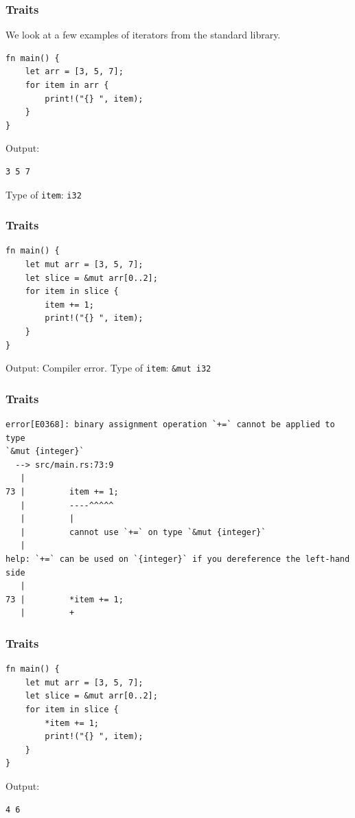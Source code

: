 \begin{frame}[fragile]
    \frametitle{Traits}
    We look at a few examples of iterators from the standard library.
    \vfill
    \begin{verbatim}
fn main() {
    let arr = [3, 5, 7];
    for item in arr {
        print!("{} ", item);
    }
}
    \end{verbatim}
    \vfill
    Output:
    \pause
    \begin{verbatim}
3 5 7 
    \end{verbatim}
    \pause
    \vfill
    Type of \texttt{item}:
    \pause
    \texttt{i32}
\end{frame}

\begin{frame}[fragile]
    \frametitle{Traits}
    \begin{verbatim}
fn main() {
    let mut arr = [3, 5, 7];
    let slice = &mut arr[0..2];
    for item in slice {
        item += 1;
        print!("{} ", item);
    }
}
    \end{verbatim}
    \vfill
    Output:
    \pause
    Compiler error.
    \pause
    \vfill
    Type of \texttt{item}:
    \pause
    \texttt{\&mut i32}
\end{frame}

\begin{frame}[fragile]
    \frametitle{Traits}
    \begin{verbatim}
error[E0368]: binary assignment operation `+=` cannot be applied to type
`&mut {integer}`
  --> src/main.rs:73:9
   |
73 |         item += 1;
   |         ----^^^^^
   |         |
   |         cannot use `+=` on type `&mut {integer}`
   |
help: `+=` can be used on `{integer}` if you dereference the left-hand
side
   |
73 |         *item += 1;
   |         +
    \end{verbatim}
\end{frame}

\begin{frame}[fragile]
    \frametitle{Traits}
    \begin{verbatim}
fn main() {
    let mut arr = [3, 5, 7];
    let slice = &mut arr[0..2];
    for item in slice {
        *item += 1;
        print!("{} ", item);
    }
}
    \end{verbatim}
    \vfill
    Output:
    \pause
    \begin{verbatim}
4 6
    \end{verbatim}
\end{frame}



